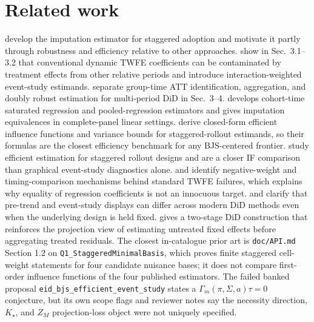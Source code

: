 \documentclass[11pt]{article}
\theoremstyle{definition}
\theoremstyle{plain}
\theoremstyle{remark}
\begin{document}
\section{Related work}
\citet[Sec.~4 and App.~A]{borusyak_jaravel_spiess_2024_restud} develop the imputation estimator for staggered adoption and motivate it partly through robustness and efficiency relative to other approaches. \citet{sun_abraham_2021_joe} show in Sec.~3.1--3.2 that conventional dynamic TWFE coefficients can be contaminated by treatment effects from other relative periods and introduce interaction-weighted event-study estimands. \citet{callaway_santanna_2021_joe} separate group-time ATT identification, aggregation, and doubly robust estimation for multi-period DiD in Sec.~3--4. \citet[Sec.~3]{wooldridge_2023_ectj} develops cohort-time saturated regression and pooled-regression estimators and gives imputation equivalences in complete-panel linear settings. \citet[Thm.~1, Sec.~3]{chen_santanna_xie_2025} derive closed-form efficient influence functions and variance bounds for staggered-rollout estimands, so their formulas are the closest efficiency benchmark for any BJS-centered frontier. \citet{roth_santanna_2021} study efficient estimation for staggered rollout designs and are a closer IF comparison than graphical event-study diagnostics alone. \citet[Thm.~1, Sec.~3]{dechaisemartin_dhaultfoeuille_2020_aer} and \citet[Sec.~3]{goodman_bacon_2021_joe} identify negative-weight and timing-comparison mechanisms behind standard TWFE failures, which explains why equality of regression coefficients is not an innocuous target. \citet{roth_santanna_bilinski_poe_2023_joe} and \citet{roth_2026_eventstudy_note} clarify that pre-trend and event-study displays can differ across modern DiD methods even when the underlying design is held fixed. \citet{gardner_2022_did2s} gives a two-stage DiD construction that reinforces the projection view of estimating untreated fixed effects before aggregating treated residuals. The closest in-catalogue prior art is \texttt{doc/API.md} Section 1.2 on \texttt{Q1\_StaggeredMinimalBasis}, which proves finite staggered cell-weight statements for four candidate nuisance bases; it does not compare first-order influence functions of the four published estimators. The failed banked proposal \texttt{eid\_bjs\_efficient\_event\_study} states a \(\Gamma_m(\pi,\Sigma,a)\tau=0\) conjecture, but its own scope flags and reviewer notes say the necessity direction, \(K_\star\), and \(Z_M\) projection-loss object were not uniquely specified.
\end{document}
